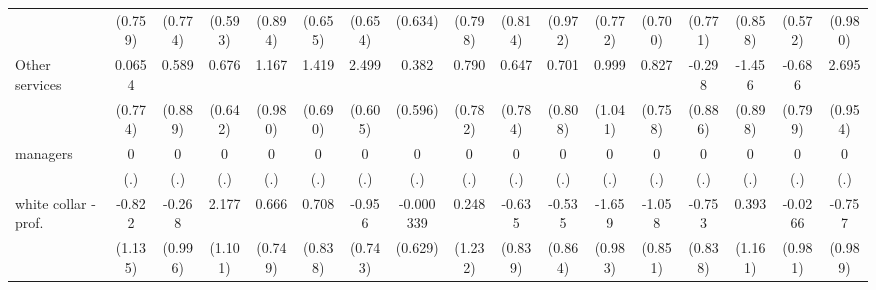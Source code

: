{\begin{tabular}{l*{16}{c}}
                    &     (0.759)         &     (0.774)         &     (0.593)         &     (0.894)         &     (0.655)         &     (0.654)         &     (0.634)         &     (0.798)         &     (0.814)         &     (0.972)         &     (0.772)         &     (0.700)         &     (0.771)         &     (0.858)         &     (0.572)         &     (0.980)         \\
[1em]
Other services      &      0.0654         &       0.589         &       0.676         &       1.167         &       1.419\sym{*}  &       2.499\sym{***}&       0.382         &       0.790         &       0.647         &       0.701         &       0.999         &       0.827         &      -0.298         &      -1.456         &      -0.686         &       2.695\sym{**} \\
                    &     (0.774)         &     (0.889)         &     (0.642)         &     (0.980)         &     (0.690)         &     (0.605)         &     (0.596)         &     (0.782)         &     (0.784)         &     (0.808)         &     (1.041)         &     (0.758)         &     (0.886)         &     (0.898)         &     (0.799)         &     (0.954)         \\
[1em]
managers            &           0         &           0         &           0         &           0         &           0         &           0         &           0         &           0         &           0         &           0         &           0         &           0         &           0         &           0         &           0         &           0         \\
                    &         (.)         &         (.)         &         (.)         &         (.)         &         (.)         &         (.)         &         (.)         &         (.)         &         (.)         &         (.)         &         (.)         &         (.)         &         (.)         &         (.)         &         (.)         &         (.)         \\
[1em]
white collar - prof.&      -0.822         &      -0.268         &       2.177\sym{*}  &       0.666         &       0.708         &      -0.956         &   -0.000339         &       0.248         &      -0.635         &      -0.535         &      -1.659         &      -1.058         &      -0.753         &       0.393         &     -0.0266         &      -0.757         \\
                    &     (1.135)         &     (0.996)         &     (1.101)         &     (0.749)         &     (0.838)         &     (0.743)         &     (0.629)         &     (1.232)         &     (0.839)         &     (0.864)         &     (0.983)         &     (0.851)         &     (0.838)         &     (1.161)         &     (0.981)         &     (0.989)         \\

\end{tabular}}
